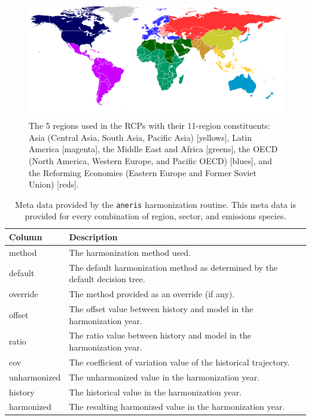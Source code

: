 \documentclass[review]{elsarticle}
\newcommand{\code}[1]{\lstinline[basicstyle=\ttfamily\color{black}]|#1|}
\begin{document}
\begin{figure}
  \begin{center}
    \includegraphics[width=\textwidth]{MESSAGE_11-5regions_map.pdf}
    \caption[]{
      \label{fig:regions}
      The 5 regions used in the RCPs with their 11-region constituents: Asia
      (Central Asia, South Asia, Pacific Asia) [yellows], Latin America
      [magenta], the Middle East and Africa [greens], the OECD (North America,
      Western Europe, and Pacific OECD) [blues], and the Reforming Economies
      (Eastern Europe and Former Soviet Union) [reds].  }
  \end{center}
\end{figure}

\begin{table}[]
\centering
\caption{Meta data provided by the \code{aneris} harmonization routine. This meta data is provided for every combination of region, sector, and emissions species.}
\label{tab:metadata}
\begin{tabular}{|p{2cm}|p{8cm}|}
\hline
\textbf{Column}       & \textbf{Description}                                      \\
\hline
\hline
method       & The harmonization method used.                                               \\
\hline
default      & The default harmonization method as determined by the default decision tree. \\
\hline
override     & The method provided as an override (if any).                                 \\
\hline
offset       & The offset value between history and model in the harmonization year.        \\
\hline
ratio        & The ratio value between history and model in the harmonization year.         \\
\hline
cov          & The coefficient of variation value of the historical trajectory.                           \\
\hline
unharmonized & The unharmonized value in the harmonization year.                            \\
\hline
history      & The historical value in the harmonization year.                             \\
\hline
harmonized   & The resulting harmonized value in the harmonization year.\\
\hline
\end{tabular}
\end{table}
\end{document}
